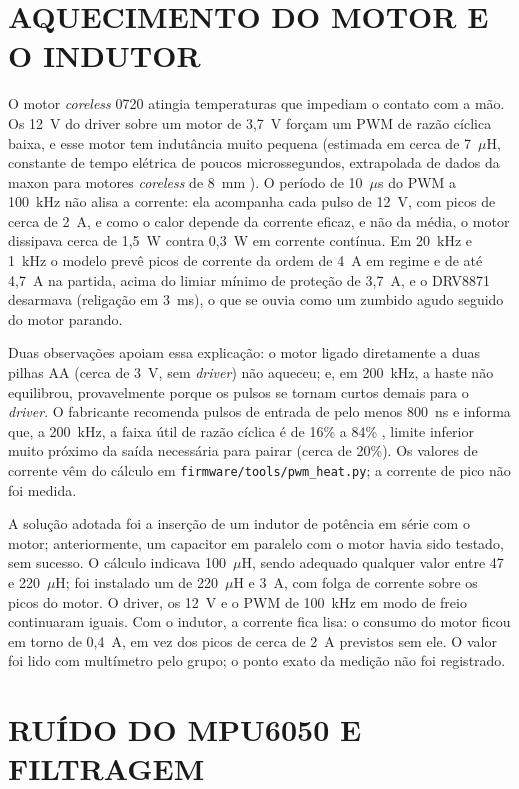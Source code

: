 \section{AQUECIMENTO DO MOTOR E O INDUTOR}\label{sec:indutor}

O motor \textit{coreless} 0720 atingia temperaturas que impediam o contato com a mão. Os 12~V do driver sobre um motor de 3,7~V forçam um PWM de razão cíclica baixa, e esse motor tem indutância muito pequena (estimada em cerca de 7~$\mu$H, constante de tempo elétrica de poucos microssegundos, extrapolada de dados da maxon para motores \textit{coreless} de 8~mm \cite{maxonchoke}). O período de 10~$\mu$s do PWM a 100~kHz não alisa a corrente: ela acompanha cada pulso de 12~V, com picos de cerca de 2~A, e como o calor depende da corrente eficaz, e não da média, o motor dissipava cerca de 1,5~W contra 0,3~W em corrente contínua. Em 20~kHz e 1~kHz o modelo prevê picos de corrente da ordem de 4~A em regime e de até 4,7~A na partida, acima do limiar mínimo de proteção de 3,7~A, e o DRV8871 desarmava (religação em 3~ms), o que se ouvia como um zumbido agudo seguido do motor parando.

Duas observações apoiam essa explicação: o motor ligado diretamente a duas pilhas AA (cerca de 3~V, sem \textit{driver}) não aqueceu; e, em 200~kHz, a haste não equilibrou, provavelmente porque os pulsos se tornam curtos demais para o \textit{driver}. O fabricante recomenda pulsos de entrada de pelo menos 800~ns e informa que, a 200~kHz, a faixa útil de razão cíclica é de 16\% a 84\% \cite{drv8871ds}, limite inferior muito próximo da saída necessária para pairar (cerca de 20\%). Os valores de corrente vêm do cálculo em \texttt{firmware/tools/pwm\_heat.py}; a corrente de pico não foi medida.

A solução adotada foi a inserção de um indutor de potência em série com o motor; anteriormente, um capacitor em paralelo com o motor havia sido testado, sem sucesso. O cálculo indicava 100~$\mu$H, sendo adequado qualquer valor entre 47 e 220~$\mu$H; foi instalado um de 220~$\mu$H e 3~A, com folga de corrente sobre os picos do motor. O driver, os 12~V e o PWM de 100~kHz em modo de freio continuaram iguais. Com o indutor, a corrente fica lisa: o consumo do motor ficou em torno de 0,4~A, em vez dos picos de cerca de 2~A previstos sem ele. O valor foi lido com multímetro pelo grupo; o ponto exato da medição não foi registrado.

\section{RUÍDO DO MPU6050 E FILTRAGEM}\label{sec:ruido}

